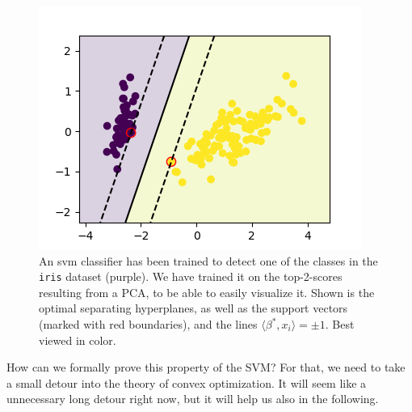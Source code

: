 \documentclass{article}
\newcommand{\sprod}[1]{\langle #1 \rangle}
\begin{document}
\begin{figure}
    \centering
    \includegraphics[width=0.5\linewidth]{graphics/svm_classifier.png}
    \caption{An svm classifier has been trained to detect one of the classes in the \texttt{iris} dataset (purple). We have trained it on the top-2-scores resulting from a PCA, to be able to easily visualize it. Shown is the optimal separating hyperplanes, as well as the support vectors (marked with red boundaries), and the lines $\sprod{\beta^*,x_i}=\pm 1$. Best viewed in color. }
    \label{fig:svm}
\end{figure}

How can we formally prove this property of the SVM? For that, we need to take a small detour into the theory of convex optimization. It will seem like a unnecessary long detour right now, but it will help us also in the following. 
\end{document}
